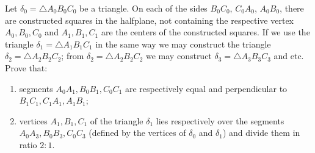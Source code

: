 Let $\delta_0=\triangle A_0B_0C_0$ be a triangle. On each of the sides $B_0C_0$, $C_0A_0$, $A_0B_0$, there are constructed squares in the halfplane, not containing the respective vertex $A_0,B_0,C_0$ and $A_1,B_1,C_1$ are the centers of the constructed squares. If we use the triangle $\delta_1=\triangle A_1B_1C_1$ in the same way we may construct the triangle $\delta_2=\triangle A_2B_2C_2$; from $\delta_2=\triangle A_2B_2C_2$ we may construct $\delta_3=\triangle A_3B_3C_3$ and etc. Prove that:

\begin{enumerate}[label = (\alph*)]
  \item segments $A_0A_1,B_0B_1,C_0C_1$ are respectively equal and perpendicular to $B_1C_1,C_1A_1,A_1B_1$;
  \item vertices $A_1,B_1,C_1$ of the triangle $\delta_1$ lies respectively over the segments $A_0A_3,B_0B_3,C_0C_3$ (defined by the vertices of $\delta_0$ and $\delta_1$) and divide them in ratio $2:1$.
\end{enumerate}
